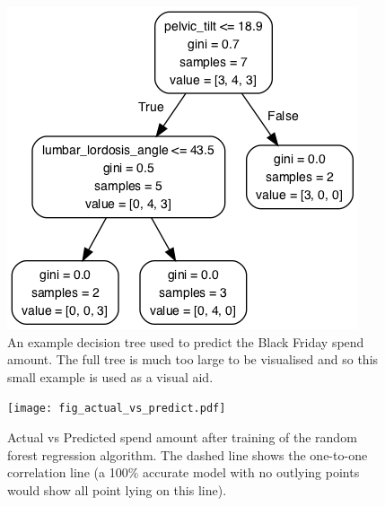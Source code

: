 \documentclass[10pt]{article}
\begin{document}
\begin{figure}
\begin{center}
\includegraphics[scale=0.4,angle=0,trim=8cm 0cm 0cm 2cm]{small_tree_0_0.png}
\caption{An example decision tree used to predict the Black Friday spend amount. The full tree is much too large to be visualised and so this small example is used as a visual aid.}
\label{fig_smalltree}
\end{center}
\end{figure} 


\begin{figure}
\begin{center}
\texttt{[image: fig\_actual\_vs\_predict.pdf]}
\caption{Actual vs Predicted spend amount after training of the random forest regression algorithm. The dashed line shows the one-to-one correlation line (a 100\% accurate model with no outlying points would show all point lying on this line).}
\label{fig_predict}
\end{center}
\end{figure} 
\end{document}
